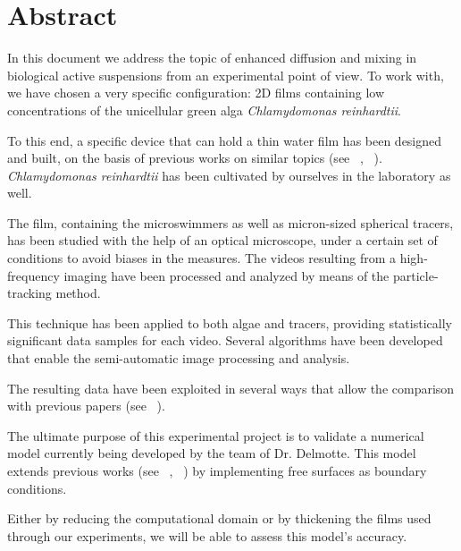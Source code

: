\chapter*{Abstract}
\label{abstract}
In this document we address the topic of enhanced diffusion and mixing in biological active suspensions from an experimental point of view. To work with, we have chosen a very specific configuration: 2D films containing low concentrations of the unicellular green alga \textit{Chlamydomonas reinhardtii}.

To this end, a specific device that can hold a thin water film has been designed and built, on the basis of previous works on similar topics (see ~\cite{Sokolov2007}, ~\cite{Guasto}). \textit{Chlamydomonas reinhardtii} has been cultivated by ourselves in the laboratory as well.

The film, containing the microswimmers as well as micron-sized spherical tracers, has been studied with the help of an optical microscope, under a certain set of conditions to avoid biases in the measures. The videos resulting from a high-frequency imaging have been processed and analyzed by means of the particle-tracking method. 

This technique has been applied to both algae and tracers, providing statistically significant data samples for each video. Several algorithms have been developed that enable the semi-automatic image processing and analysis.

The resulting data have been exploited in several ways that allow the comparison with previous papers (see ~\cite{Kurtuldu2011}). 

The ultimate purpose of this experimental project is to validate a numerical model currently being developed by the team of Dr. Delmotte. This model extends previous works (see ~\cite{Delmotte2015}, ~\cite{Delmotte2018}) by implementing free surfaces as boundary conditions.

Either by reducing the computational domain or by thickening the films used through our experiments, we will be able to assess this model's accuracy.
